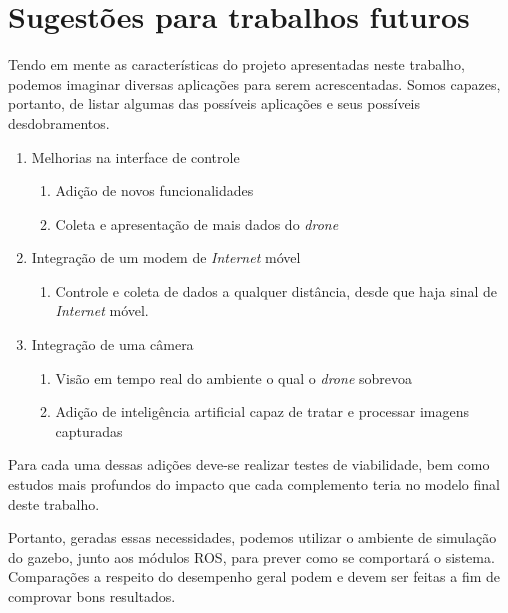 \documentclass[12pt,a4paper,oneside]{book}
\begin{document}
\section{Sugestões para trabalhos futuros}
%
\thispagestyle{empty} 
%
%
Tendo em mente as características do projeto apresentadas neste trabalho, podemos imaginar diversas aplicações para serem acrescentadas. Somos capazes, portanto, de listar algumas das possíveis aplicações e seus possíveis desdobramentos.
%
\begin{enumerate}
    \item Melhorias na interface de controle 
        \begin{enumerate}
            \item Adição de novos funcionalidades
            \item Coleta e apresentação de mais dados do \textit{drone}  
        \end{enumerate}
    \item Integração de um modem de \textit{Internet} móvel
        \begin{enumerate}
            \item Controle e coleta de dados a qualquer distância, desde que haja sinal de \textit{Internet} móvel.
        \end{enumerate}
    \item Integração de uma câmera
        \begin{enumerate}
            \item Visão em tempo real do ambiente o qual o \textit{drone} sobrevoa
            \item Adição de inteligência artificial capaz de tratar e processar imagens capturadas
        \end{enumerate}
\end{enumerate}

Para cada uma dessas adições deve-se realizar testes de viabilidade, bem como estudos mais profundos do impacto que cada complemento teria no modelo final deste trabalho. 

Portanto, geradas essas necessidades, podemos utilizar o ambiente de simulação do gazebo, junto aos módulos ROS, para prever como se comportará o sistema. Comparações a respeito do desempenho geral podem e devem ser feitas a fim de comprovar bons resultados.



\end{document}
